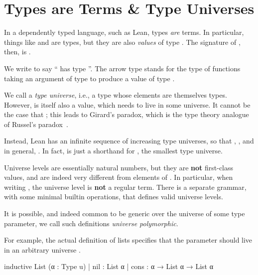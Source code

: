 \section{Types are Terms \& Type Universes}
In a dependently typed language, such as Lean, types \emph{are} terms. In particular, things like  and  are types, but they are also \emph{values} of type \Type{}.
The signature of , then, is .


\begin{remark}
    We write  to say `` has type ''.
    The arrow type  stands for the type of functions taking an argument of type 
    to produce a value of type .
\end{remark}

We call \Type{} a \emph{type universe}, i.e., a type whose elements are themselves types. However, \Type{} is itself also a value, which needs to live in some universe.
It cannot be the case that ; this leads to Girard's paradox, which is the type theory analogue of Russel's paradox~\cite{girardInterpretationFonctionelleElimination1972}.

Instead, Lean has an infinite sequence of increasing type universes, so that , , and in general, . In fact,  is just a shorthand for , the smallest type universe.

Universe levels  are essentially natural numbers, but they are \textbf{not} first-class values, and are indeed very different from elements of .
In particular, when writing , the universe level  is \textbf{not} a regular term. There is a separate grammar, with some minimal builtin operations, that defines valid universe levels.

It is possible, and indeed common to be generic over the universe of some type parameter, we call such 
definitions \emph{universe polymorphic}.

For example, the actual definition of lists specifies that the parameter  should live in an arbitrary universe .
\begin{leancode}
  inductive List (α : Type u)
    | nil  : List α
    | cons : α → List α → List α
\end{leancode}


